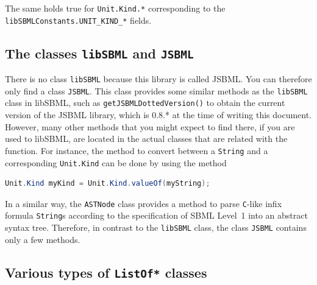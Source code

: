The same holds true for \texttt{Unit.Kind.*} corresponding to the
\texttt{libSBMLConstants.UNIT\_KIND\_*}
%
fields.

\subsection{The classes \texttt{libSBML} and \texttt{JSBML}}

There is no class \texttt{libSBML} because this library is called JSBML.
%
You can therefore only find a class \texttt{JSBML}.
%
This class provides some similar methods as the \texttt{libSBML} class in
libSBML, such as \texttt{getJSBMLDottedVersion()}
%
to obtain the current version of the JSBML library, which is 0.8.* at the time of
writing this document. However, many other methods that you might expect
to find there, if you are used to libSBML, are located in the actual classes
that are related with the function. For instance, the method to convert between
a \texttt{String}
%
%
and a corresponding \texttt{Unit.Kind}
%
can be done by using the method
\begin{lstlisting}[language=Java,numbers=none]
Unit.Kind myKind = Unit.Kind.valueOf(myString);
\end{lstlisting}
In a similar way, the \texttt{ASTNode} class
provides a method to parse \texttt{C}-like infix formula
\texttt{String}s according to the
specification of SBML Level~1 \citep{Hucka2003} into an
abstract syntax tree. Therefore, in contrast to
the \texttt{libSBML} class, the class \texttt{JSBML}
contains only a few methods.


\subsection{Various types of \texttt{ListOf*} classes}


